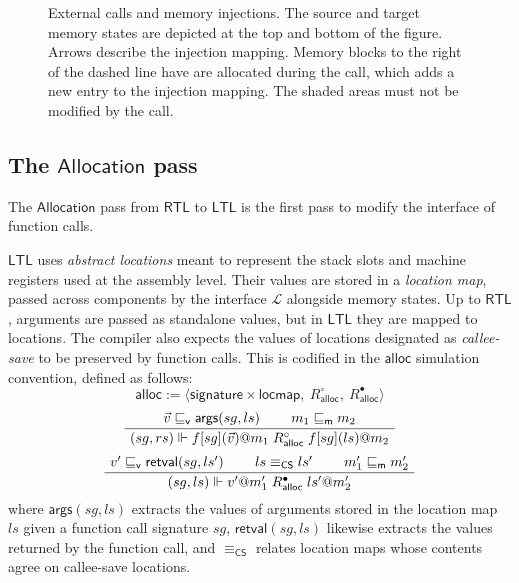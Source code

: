 \documentclass[sigplan,10pt,review,anonymous]{acmart}
\newcommand{\kw}[1]{\ensuremath{ \mathsf{#1} }}
\newcommand{\que}{\circ}
\newcommand{\ans}{\bullet}
\newcommand{\vref}{\sqsubseteq_\kw{v}}
\newcommand{\mext}{\sqsubseteq_\kw{m}}
\begin{document}
\begin{figure} %
  \caption{External calls and memory injections.
    The source and target memory states are
    depicted at the top and bottom
    of the figure. Arrows describe the injection mapping.
    Memory blocks to the right of the dashed line
    have are allocated during the call,
    which adds a new entry to the injection mapping.
    The shaded areas must not be modified by the call.
  }
  \label{fig:injp}
\end{figure}


\subsection{The \kw{Allocation} pass} %

The \kw{Allocation} pass from \kw{RTL} to \kw{LTL}
is the first pass to modify the interface of function calls.

\kw{LTL} uses \emph{abstract locations}
meant to represent the stack slots and machine registers
used at the assembly level.
Their values are stored in a \emph{location map},
passed across components by the interface $\mathcal{L}$
alongside memory states.
Up to \kw{RTL},
arguments are passed as standalone values,
but in \kw{LTL}
they are mapped to locations.
The compiler also expects the values of
locations designated as \emph{callee-save}
to be preserved by function calls.
This is codified in the $\kw{alloc}$
simulation convention, defined as follows:
\[
  \kw{alloc} := \langle
      \kw{signature} \times \kw{locmap}, \:
      R_\kw{alloc}^\que, \:
      R_\kw{alloc}^\ans \rangle
\]
\[
  \AxiomC{$\vec{v} \vref \kw{args}(sg, ls)$}
  \AxiomC{$m_1 \mext m_2$}
  \BinaryInfC{$
      (sg, rs) \Vdash
      f[sg](\vec{v})@m_1
      \mathrel{R_\kw{alloc}^\que}
      f[sg](ls)@m_2$}
  \DisplayProof
\]
\vspace{0.5ex}
\[
  \AxiomC{$v' \vref \kw{retval}(sg, ls')$}
  \AxiomC{$ls \equiv_\kw{CS} ls'$}
  \AxiomC{$m_1' \mext m_2'$}
  \TrinaryInfC{$
      (sg, ls) \Vdash
      v'@m_1'
      \mathrel{R_\kw{alloc}^\ans}
      ls'@m_2'$}
  \DisplayProof
\]
where $\kw{args}(sg, ls)$ extracts the values of arguments
stored in the location map $ls$ given a function call signature $sg$,
$\kw{retval}(sg, ls)$ likewise extracts the
values returned by the function call, and
$\equiv_\kw{CS}$ relates location maps whose contents agree
on callee-save locations.
\end{document}
